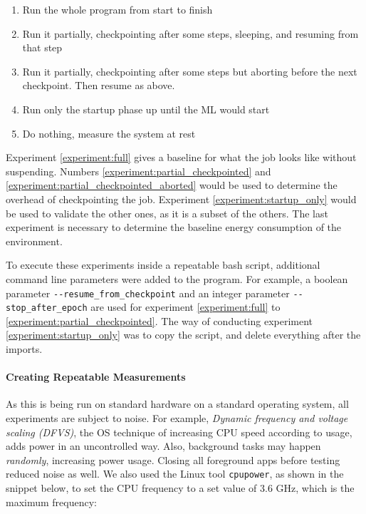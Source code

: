 \begin{enumerate}
    \item \label{experiment:full}Run the whole program from start to finish
    \item \label{experiment:partial_checkpointed}Run it partially, checkpointing after some steps, sleeping, and resuming from that step
    \item \label{experiment:partial_checkpointed_aborted}Run it partially, checkpointing after some steps but aborting before the next checkpoint. Then resume as above.
    \item \label{experiment:startup_only}Run only the startup phase up until the ML would start
    \item \label{experiment:baseline}Do nothing, measure the system at rest
\end{enumerate}

Experiment \ref{experiment:full} gives a baseline for what the job looks like without suspending. 
Numbers \ref{experiment:partial_checkpointed} and \ref{experiment:partial_checkpointed_aborted} would be used to determine the overhead of checkpointing the job. 
Experiment \ref{experiment:startup_only} would be used to validate the other ones, as it is a subset of the others. 
The last experiment is necessary to determine the baseline energy consumption of the environment.

To execute these experiments inside a repeatable bash script, additional command line parameters were added to the program. 
For example, a boolean parameter \verb|--resume_from_checkpoint| and an integer parameter \verb|--stop_after_epoch| are used for experiment \ref{experiment:full} to \ref{experiment:partial_checkpointed}. 
The way of conducting experiment \ref{experiment:startup_only} was to copy the script, and delete everything after the imports.

\paragraph{Creating Repeatable Measurements}

As this is being run on standard hardware on a standard operating system, all experiments are subject to noise. 
For example, \emph{Dynamic frequency and voltage scaling (DFVS)}, the OS technique of increasing CPU speed according to usage, adds power in an uncontrolled way. 
Also, background tasks may happen \emph{randomly}, increasing power usage. 
Closing all foreground apps before testing reduced noise as well.
We also used the Linux tool \verb|cpupower|, as shown in the snippet below, to set the CPU frequency to a set value of 3.6 GHz, which is the maximum frequency:

